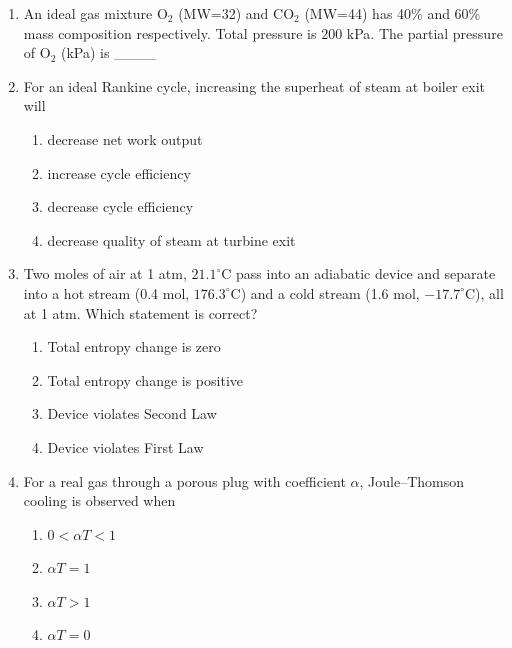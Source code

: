 \documentclass[journal,12pt,onecolumn]{IEEEtran}
\begin{document}
\begin{enumerate}[label=\arabic*)]
\item An ideal gas mixture O$_2$ (MW=32) and CO$_2$ (MW=44) has 40\% and 60\% mass composition respectively. Total pressure is $200$ kPa. The partial pressure of O$_2$ (kPa) is \_\_\_\_
\hfill{} \\

\vspace{0.5cm}

\item For an ideal Rankine cycle, increasing the superheat of steam at boiler exit will 
\hfill{} \\

\vspace{0.2cm}
\begin{enumerate}[label=\alph*)]
\item decrease net work output
\item increase cycle efficiency
\item decrease cycle efficiency
\item decrease quality of steam at turbine exit
\end{enumerate}
\vspace{0.5cm}

\item Two moles of air at 1 atm, $21.1^\circ$C pass into an adiabatic device and separate into a hot stream (0.4 mol, $176.3^\circ$C) and a cold stream (1.6 mol, $-17.7^\circ$C), all at 1 atm. Which statement is correct? 
\vspace{0.2cm}
\hfill{} \\

\begin{enumerate}[label=\alph*)]
\item Total entropy change is zero
\item Total entropy change is positive
\item Device violates Second Law
\item Device violates First Law
\end{enumerate}
\vspace{0.5cm}

\item For a real gas through a porous plug with coefficient $\alpha$, Joule–Thomson cooling is observed when
\vspace{0.2cm}
\hfill{} \\

\begin{enumerate}[label=\alph*)]
\item $0 < \alpha T < 1$
\item $\alpha T = 1$
\item $\alpha T > 1$
\item $\alpha T = 0$
\end{enumerate}
\vspace{0.5cm}


\end{enumerate}
\end{document}
